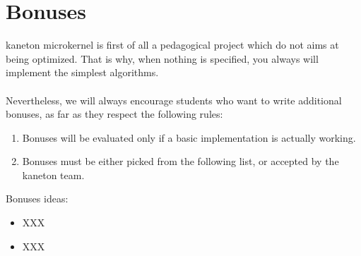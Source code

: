 %
%

\newpage

\section{Bonuses}

kaneton microkernel is first of all a pedagogical project which do not
aims at being optimized. That is why, when nothing is specified, you
always will implement the simplest algorithms.\\
\\
Nevertheless, we will always encourage students who want to write
additional bonuses, as far as they respect the following rules:

\begin{enumerate}
  \item Bonuses will be evaluated only if a basic implementation is
  actually working.
  \item Bonuses must be either picked from the following list, or
  accepted by the kaneton team.\\
\end{enumerate}

Bonuses ideas:
\begin{itemize}
\item XXX
\item XXX
\end{itemize}
